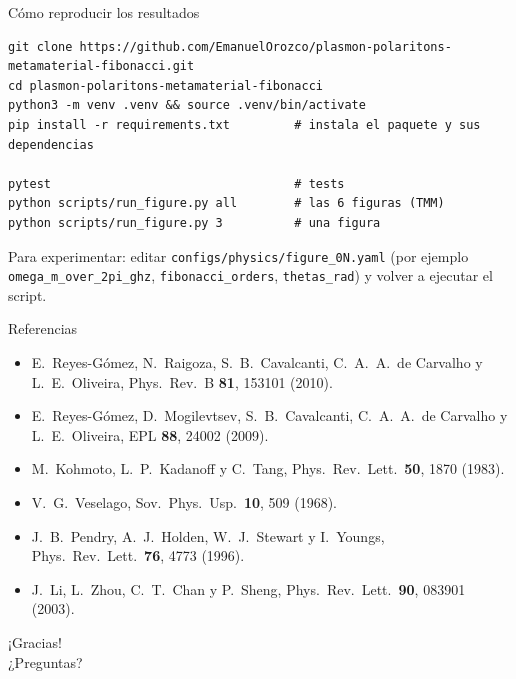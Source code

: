 \documentclass[aspectratio=169,10pt]{beamer}
\begin{document}
\begin{frame}[fragile]{Cómo reproducir los resultados}
\footnotesize
\begin{verbatim}
git clone https://github.com/EmanuelOrozco/plasmon-polaritons-metamaterial-fibonacci.git
cd plasmon-polaritons-metamaterial-fibonacci
python3 -m venv .venv && source .venv/bin/activate
pip install -r requirements.txt         # instala el paquete y sus dependencias

pytest                                  # tests
python scripts/run_figure.py all        # las 6 figuras (TMM)
python scripts/run_figure.py 3          # una figura
\end{verbatim}
  \vspace{0.3em}
  \small Para experimentar: editar \texttt{configs/physics/figure\_0N.yaml} (por ejemplo \texttt{omega\_m\_over\_2pi\_ghz}, \texttt{fibonacci\_orders}, \texttt{thetas\_rad}) y volver a ejecutar el script.
\end{frame}

\begin{frame}{Referencias}
  \small
  \begin{itemize}
    \item E.~Reyes-Gómez, N.~Raigoza, S.~B.~Cavalcanti, C.~A.~A.~de Carvalho y L.~E.~Oliveira, Phys.\ Rev.\ B \textbf{81}, 153101 (2010).
    \item E.~Reyes-Gómez, D.~Mogilevtsev, S.~B.~Cavalcanti, C.~A.~A.~de Carvalho y L.~E.~Oliveira, EPL \textbf{88}, 24002 (2009).
    \item M.~Kohmoto, L.~P.~Kadanoff y C.~Tang, Phys.\ Rev.\ Lett.\ \textbf{50}, 1870 (1983).
    \item V.~G.~Veselago, Sov.\ Phys.\ Usp.\ \textbf{10}, 509 (1968).
    \item J.~B.~Pendry, A.~J.~Holden, W.~J.~Stewart y I.~Youngs, Phys.\ Rev.\ Lett.\ \textbf{76}, 4773 (1996).
    \item J.~Li, L.~Zhou, C.~T.~Chan y P.~Sheng, Phys.\ Rev.\ Lett.\ \textbf{90}, 083901 (2003).
  \end{itemize}
\end{frame}

\begin{frame}[standout]
  ¡Gracias!\\[0.5em]
  \normalsize ¿Preguntas?
\end{frame}
\end{document}
